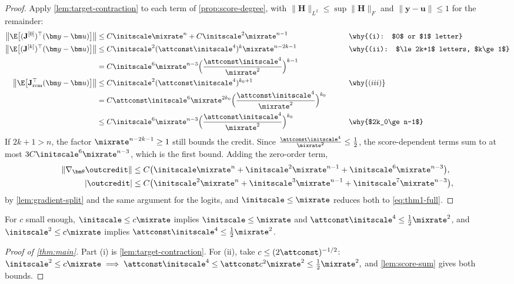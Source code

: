 \begin{proof}
Apply \cref{lem:target-contraction} to each term of \cref{prop:score-degree}, with $\|\mathbf H\|_{L^2}\le\sup\|\mathbf H\|_F$ and $\|\bm y-\bm u\|\le1$ for the remainder:
\begin{alignat*}{2}
 \bigl\|\E\bigl[(\mathbf J^{[0]})^\top(\bm y-\bm u)\bigr]\bigr\|&\le C\initscale\mixrate^n+C\initscale^2\mixrate^{n-1} &\qquad& \why{(i): $0$ or $1$ letter}\\
 \bigl\|\E\bigl[(\mathbf J^{[k]})^\top(\bm y-\bm u)\bigr]\bigr\|&\le C\initscale^2(\attconst\initscale^4)^k\mixrate^{n-2k-1} && \why{(ii): $\le2k+1$ letters, $k\ge1$}\\
 &=C\initscale^6\mixrate^{n-3}\Bigl(\frac{\attconst\initscale^4}{\mixrate^2}\Bigr)^{k-1} && \\
 \bigl\|\E\bigl[\mathbf J_{\mathrm{rem}}^\top(\bm y-\bm u)\bigr]\bigr\|&\le C\initscale^2(\attconst\initscale^4)^{k_0+1} && \why{(iii)}\\
 &=C\attconst\initscale^6\mixrate^{2k_0}\Bigl(\frac{\attconst\initscale^4}{\mixrate^2}\Bigr)^{k_0} && \\
 &\le C\initscale^6\mixrate^{n-3}\Bigl(\frac{\attconst\initscale^4}{\mixrate^2}\Bigr)^{k_0} && \why{$2k_0\ge n-1$}
\end{alignat*}
If $2k+1>n$, the factor $\mixrate^{n-2k-1}\ge1$ still bounds the credit. Since $\frac{\attconst\initscale^4}{\mixrate^2}\le\frac{1}{2}$, the
score-dependent terms sum to at most $3C\initscale^6\mixrate^{n-3}$, which is the first bound. Adding the zero-order term,
\begin{align*}
 \|\nabla_{\bm\theta}\outcredit\|&\le C\bigl(\initscale\mixrate^n+\initscale^2\mixrate^{n-1}+\initscale^6\mixrate^{n-3}\bigr),\\
 |\outcredit|&\le C\bigl(\initscale^2\mixrate^n+\initscale^3\mixrate^{n-1}+\initscale^7\mixrate^{n-3}\bigr),
\end{align*}
by \cref{lem:gradient-split} and the same argument for the logits, and $\initscale\le\mixrate$ reduces both to \cref{eq:thm1-full}.
\end{proof}

For $c$ small enough, $\initscale\le c\mixrate$ implies $\initscale\le\mixrate$ and $\attconst\initscale^4\le\frac{1}{2}\mixrate^2$, and $\initscale^2\le c\mixrate$ implies $\attconst\initscale^4\le\frac{1}{2}\mixrate^2$.

\begin{proof}[Proof of \cref{thm:main}]
Part (i) is \cref{lem:target-contraction}. For (ii), take $c\le(2\attconst)^{-1/2}$:
 $\initscale^2\le c\mixrate\implies \attconst\initscale^4\le\attconst c^2\mixrate^2\le\tfrac{1}{2}\mixrate^2,$ 
and \cref{lem:score-sum} gives both bounds.
\end{proof}

